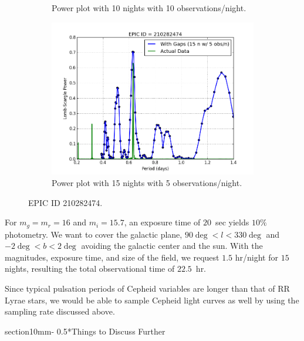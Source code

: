 \documentclass[letterpaper,11pt]{article}
\makeatletter
\renewcommand{\section}{\@startsection%
{section}{1}{0mm}{-\baselineskip}%
{0.5\baselineskip}{\normalfont\Large\bfseries}}%
\makeatother
\begin{document}
\begin{figure}[H]
\begin{subfigure}{.5\textwidth}
  \caption{Power plot with 10 nights with 10 observations/night.}
  \label{fig:1010}
  \end{subfigure}%
  \begin{subfigure}{.5\textwidth}
  \centering
  \includegraphics[width=.9\linewidth]{figures/1505Actual.png}
  \caption{Power plot with 15 nights with 5 observations/night.}
  \label{fig:1505}
\end{subfigure}
\caption{EPIC ID 210282474.}
\label{fig:EPIC}
\end{figure}


\noindent For $m_g = m_r = 16$ and $m_i = 15.7$, an exposure time of $20$~sec yields $10\%$ photometry. We want to cover the galactic plane, $90\deg < l <330\deg$ and $-2 \deg < b < 2 \deg$ avoiding the galactic center and the sun. With the magnitudes, exposure time, and size of the field, we request $1.5$ hr/night for $15$ nights, resulting the total observational time of $22.5$~hr.  


\vspace{3mm} %


\noindent Since typical pulsation periods of Cepheid variables are longer than that of RR Lyrae stars, we would be able to sample Cepheid light curves as well by using the sampling rate discussed above. 




\section*{Things to Discuss Further}
\end{document}
